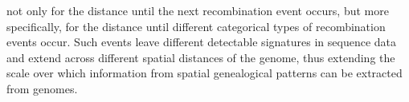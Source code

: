 \documentclass[11pt]{article}
\begin{document}
not only for the distance until the next recombination event occurs, 
% 
% 
but more specifically, for the distance until different categorical types
of recombination events occur. Such events leave different detectable 
signatures in sequence data and extend across different spatial distances 
of the genome, thus extending the scale over which information from 
spatial genealogical patterns can be extracted from genomes.
% 
% 
\end{document}
